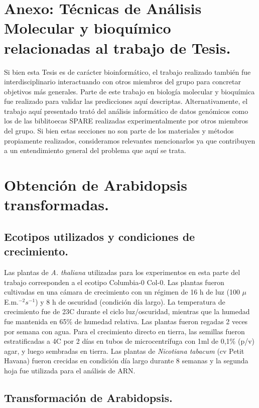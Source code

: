 \section{Anexo: Técnicas de Análisis Molecular y bioquímico relacionadas al trabajo de Tesis.}
Si bien esta Tesis es de carácter bioinformático, el trabajo realizado también fue interdisciplinario interactuando con otros miembros del grupo para concretar objetivos más generales.
Parte de este trabajo en biología molecular y bioquímica fue realizado para validar las predicciones aquí descriptas.
Alternativamente, el trabajo aquí presentado trató del análisis informático de datos genómicos como los de las biblitoecas SPARE realizadas experimentalmente por otros miembros del grupo.
Si bien estas secciones no son parte de los materiales y métodos propiamente realizados, consideramos relevantes mencionarlos ya que contribuyen a un entendimiento general del problema que aquí se trata.

\section{Obtención de Arabidopsis transformadas.}

\subsection{Ecotipos utilizados y condiciones de crecimiento.}
Las plantas de  \textit{A. thaliana} utilizadas para los experimentos en esta parte del trabajo corresponden a el ecotipo Columbia-0 Col-0.
Las plantas fueron cultivadas en una cámara de crecimiento con un régimen de 16 h de luz (100 $\mu$E.m.$^{-2}s^{-1}$) y 8 h de oscuridad (condición día largo).
La temperatura de crecimiento fue de 23\degree C durante el ciclo luz/oscuridad, mientras que la humedad fue mantenida en 65\% de humedad relativa.
Las plantas fueron regadas 2 veces por semana con agua.
Para el crecimiento directo en tierra, las semillas fueron estratificadas a 4\degree C por 2 días en tubos de microcentrífuga con 1ml de 0,1\% (p/v) agar, y luego sembradas en tierra.
Las plantas de \textit{Nicotiana tabacum} (cv Petit Havana) fueron crecidas en condición día largo durante 8 semanas y la segunda hoja fue utilizada para el análisis de ARN.

\subsection{Transformación de Arabidopsis.}

